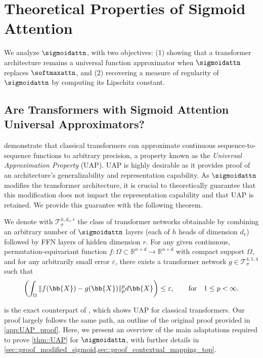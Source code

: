 \section{Theoretical Properties of Sigmoid Attention}
\label{sec:theory}
We analyze $\sigmoidattn$, with two objectives: (1) showing that a transformer architecture remains a universal function approximator when $\sigmoidattn$ replaces $\softmaxattn$, and (2) recovering a measure of regularity of $\sigmoidattn$ by computing its Lipschitz constant.

\subsection{Are Transformers with Sigmoid Attention Universal Approximators?}
\label{sec:ufa}
\cite{Yun_UAP} demonstrate that classical transformers can approximate continuous sequence-to-sequence functions to arbitrary precision, a property known as the \emph{Universal Approximation Property} (UAP). UAP is highly desirable as it provides proof of an architecture's generalizability and representation capability.
As $\sigmoidattn$ modifies the transformer architecture, it is crucial to theoretically guarantee that this modification does not impact the representation capability and that UAP is retained. We provide this guarantee with the following theorem.
\begin{theorem}
    \label{thm::UAP}
    We denote with $\mathcal{T}^{h,d_v,r}_{\sigma}$ the class of transformer networks obtainable by combining an arbitrary number of $\sigmoidattn$ layers (each of $h$ heads of dimension $d_v$) followed by FFN layers of hidden dimension $r$.
    For any given continuous, permutation-equivariant function $f:\Omega\subset\mathbb{R}^{n\times d}\to\mathbb{R}^{n\times d}$ with compact support $\Omega$, and for any arbitrarily small error $\varepsilon$, there exists a transformer network $g\in\mathcal{T}_\sigma^{4,1,4}$ such that
    \begin{equation}
        \left(\int_{\Omega}\|f(\bb{X})-g(\bb{X})\|^p_p d\bb{X}\right)\leq\varepsilon,\qquad\text{for}\quad 1\leq p<\infty.
    \end{equation}
\end{theorem}
 is the exact counterpart of \cite[Thm.~2]{Yun_UAP}, which shows UAP for classical transformers. Our proof largely follows the same path, an outline of the original proof provided in \cref{app:UAP_proof}. Here, we present an overview of the main adaptations required to prove \cref{thm::UAP} for $\sigmoidattn$, with further details in \cref{sec::proof_modified_sigmoid,sec::proof_contextual_mapping_top}.

